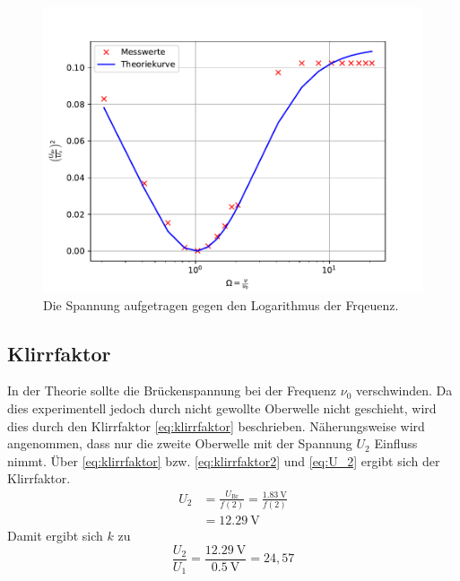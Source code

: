\begin{figure}
    \centering
    \label{fig:plot}
    \caption{Die Spannung aufgetragen gegen den Logarithmus der Frqeuenz.}
    \includegraphics[width=\textwidth]{python/fit.pdf}
\end{figure}
\subsection{Klirrfaktor}
In der Theorie sollte die Brückenspannung bei der Frequenz $\nu_0$
verschwinden. Da dies experimentell jedoch durch nicht gewollte 
Oberwelle nicht geschieht, wird dies durch den Klirrfaktor \eqref{eq:klirrfaktor}
beschrieben. Näherungsweise wird angenommen, dass nur die zweite Oberwelle mit der
Spannung $U_2$ Einfluss nimmt. Über \eqref{eq:klirrfaktor} bzw. \eqref{eq:klirrfaktor2}
und \eqref{eq:U_2} ergibt sich der Klirrfaktor.
\begin{align*}
    U_2&=\frac{U_\text{Br}}{f(2)}=\frac{\qty{1,83}{\volt}}{f(2)}\\
    &=\qty{12,29}{\volt}
\end{align*}
Damit ergibt sich $k$ zu
\begin{equation*}
    \frac{U_2}{U_1}=\frac{\qty{12,29}{\volt}}{\qty{0,5}{\volt}}=24,57
\end{equation*}